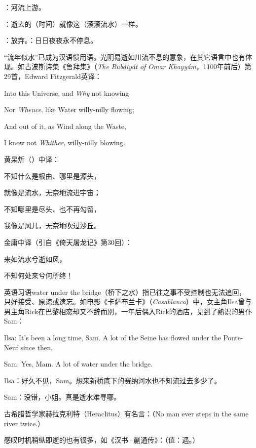 {
\item {}：河流上游。
\item {}：逝去的（时间）就像这（滚滚流水）一样。
\item {}：放弃。：日日夜夜永不停息。
}
{
“流年似水”已成为汉语惯用语。光阴易逝如川流不息的意象，在其它语言中也有体现。如古波斯诗集《鲁拜集》（\emph{The Rubáiyát of Omar Khayyám}，1100年前后）第29首，Edward Fitzgerald英译：
\begin{lyquotepoeme}
Into this Universe, and \emph{Why} not knowing

Nor \emph{Whence}, like Water willy-nilly flowing;

And out of it, as Wind along the Waste,

I know not \emph{Whither}, willy-nilly blowing.
\end{lyquotepoeme}
黄杲炘（）中译：
\begin{lyquotepoem}
不知什么是{根由}、哪里是{源头}，

就像是流水，无奈地流进宇宙；

不知哪里是{尽头}、也不再勾留，

我像是风儿，无奈地吹过沙丘。
\end{lyquotepoem}
金庸中译（引自《倚天屠龙记》第30回）：
\begin{lyquotepoem}
来如流水兮逝如风，

不知何处来兮何所终！
\end{lyquotepoem}

英语习语water under the bridge（桥下之水）指已往之事不受控制也无法追回，只好接受、原谅或遗忘。如电影《卡萨布兰卡》（\emph{Casablanca}）中，女主角Ilsa曾与男主角Rick在巴黎相恋却又不辞而别，一年后偶入Rick的酒店，见到了熟识的男仆Sam：

\begin{lyquotepoem}
Ilsa: It's been a long time, Sam. A lot of the Seine has flowed under the Ponte-Neuf since then.

Sam: Yes, Mam. A lot of water under the bridge.

Ilsa：好久不见，Sam。想来新桥底下的赛纳河水也不知流过去多少了。

Sam：没错，小姐。真是逝水难寻哪。
\end{lyquotepoem}

古希腊哲学家赫拉克利特（Heraclitus）有名言：（No man ever steps in the same river twice.）

感叹时机稍纵即逝的也有很多，如《汉书·蒯通传》：（值：遇。）
}


